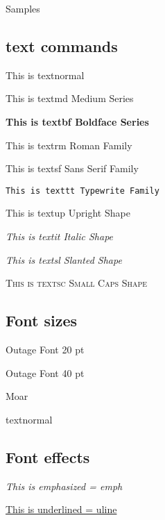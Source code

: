 Samples

\subsection{text commands}



\textnormal{This is textnormal }

\textmd{This is textmd Medium Series}

\textbf{This is textbf Boldface Series}

\textrm{This is textrm Roman Family}

\textsf{This is textsf Sans Serif Family}

\texttt{This is texttt Typewrite Family}

\textup{This is textup Upright Shape}

\textit{This is textit Italic Shape}

\textsl{This is textsl Slanted Shape}

\textsc{This is textsc Small Caps Shape}


\subsection{Font sizes}

{\fontsize{20pt}{1em}\selectfont Outage Font 20 pt}

{\fontsize{40pt}{1em}\selectfont Outage Font 40 pt

Moar}

\textnormal{textnormal}

\subsection{Font effects}

\emph{This is emphasized = emph}

\uline{This is underlined = uline}

